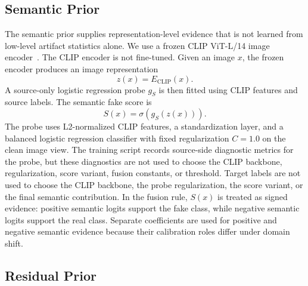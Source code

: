 \documentclass[lettersize,journal]{IEEEtran}
\begin{document}
\subsection{Semantic Prior}
\label{sec:method_semantic}

The semantic prior supplies representation-level evidence that is not learned from low-level artifact statistics alone. We use a frozen CLIP ViT-L/14 image encoder~\cite{radford2021clip}. The CLIP encoder is not fine-tuned. Given an image $x$, the frozen encoder produces an image representation
\begin{equation}
    z(x)=E_{\mathrm{CLIP}}(x).
\end{equation}
A source-only logistic regression probe $g_S$ is then fitted using CLIP features and source labels. The semantic fake score is
\begin{equation}
    S(x)=\sigma(g_S(z(x))).
\end{equation}
The probe uses L2-normalized CLIP features, a standardization layer, and a balanced logistic regression classifier with fixed regularization $C=1.0$ on the clean image view. The training script records source-side diagnostic metrics for the probe, but these diagnostics are not used to choose the CLIP backbone, regularization, score variant, fusion constants, or threshold. Target labels are not used to choose the CLIP backbone, the probe regularization, the score variant, or the final semantic contribution. In the fusion rule, $S(x)$ is treated as signed evidence: positive semantic logits support the fake class, while negative semantic logits support the real class. Separate coefficients are used for positive and negative semantic evidence because their calibration roles differ under domain shift.

\subsection{Residual Prior}
\label{sec:method_residual}
\end{document}
